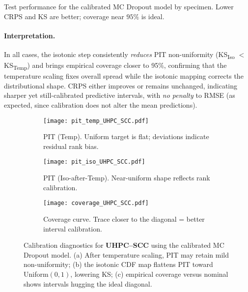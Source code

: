 \documentclass{article}
\begin{document}
\begin{table}[H]
  \centering
  \caption{Test performance for the calibrated MC Dropout model by specimen. Lower CRPS and KS are better; coverage near $95\%$ is ideal.}
  \label{tab:cal-mcdropout}
\end{table}

\paragraph{Interpretation.} In all cases, the isotonic step consistently \emph{reduces} PIT non-uniformity (KS\textsubscript{Iso} $<$ KS\textsubscript{Temp}) and brings empirical coverage closer to 95\%, confirming that the temperature scaling fixes overall spread while the isotonic mapping corrects the distributional shape. CRPS either improves or remains unchanged, indicating sharper yet still-calibrated predictive intervals, with \emph{no penalty} to RMSE (as expected, since calibration does not alter the mean predictions).


\begin{figure*}[t]
  \centering
  \begin{subfigure}[t]{0.31\textwidth}
    \texttt{[image: pit\_temp\_UHPC\_SCC.pdf]}
    \caption{PIT (Temp). Uniform target is flat; deviations indicate residual rank bias.}
  \end{subfigure}\hfill
  \begin{subfigure}[t]{0.31\textwidth}
    \texttt{[image: pit\_iso\_UHPC\_SCC.pdf]}
    \caption{PIT (Iso-after-Temp). Near-uniform shape reflects rank calibration.}
  \end{subfigure}\hfill
  \begin{subfigure}[t]{0.31\textwidth}
    \texttt{[image: coverage\_UHPC\_SCC.pdf]}
    \caption{Coverage curve. Trace closer to the diagonal = better interval calibration.}
  \end{subfigure}
  \caption{Calibration diagnostics for \textbf{UHPC--SCC} using the calibrated MC Dropout model.
  (a) After temperature scaling, PIT may retain mild non-uniformity;  
  (b) the isotonic CDF map flattens PIT toward Uniform$(0,1)$, lowering KS;  
  (c) empirical coverage versus nominal shows intervals hugging the ideal diagonal.}
  \label{fig:mcd-uhpc-scc}
\end{figure*}
\end{document}
